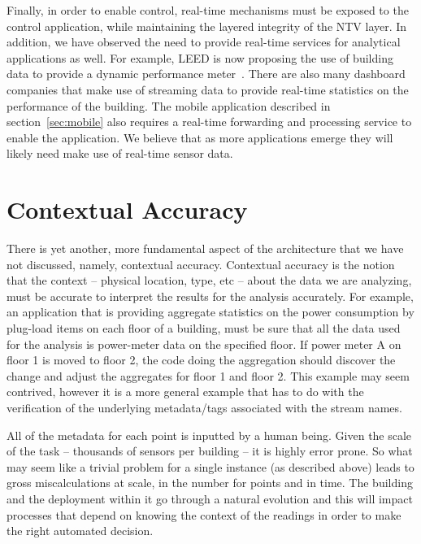 Finally, in order to enable control, real-time mechanisms must be exposed to the control application, while maintaining the 
layered integrity of the NTV layer.  In addition, we have observed the need to provide real-time services for analytical applications
as well.  For example, LEED is now proposing the use of building data to provide a dynamic performance meter~\cite{DynamicLeed}.
There are also many dashboard companies that make use of streaming data to provide real-time statistics on the performance of the
building.  The mobile application described in section~\ref{sec:mobile} also requires a real-time forwarding and processing service to
enable the application.  We believe that as more applications emerge they will likely need make use of real-time sensor data.

\section{Contextual Accuracy}
There is yet another, more fundamental aspect of the architecture that we have not discussed, namely, contextual accuracy.
Contextual accuracy is the notion that the context -- physical location, type, etc -- about the data we are analyzing, must be accurate
to interpret the results for the analysis accurately.  For example, an application that is providing aggregate statistics on the 
power consumption by plug-load items on each floor of a building, must be sure that all the data used for the analysis 
is power-meter data on the specified floor.  If power meter A on floor 1 is moved to floor 2, the code doing the aggregation
should discover the change and adjust the aggregates for floor 1 and floor 2.  This example may seem contrived, however it is a
more general example that has to do with the verification of the underlying metadata/tags associated with the stream names.

All of the metadata for each point is inputted by a human being.  Given the scale of the task -- thousands of sensors per building --
it is highly error prone.  So what may seem like a trivial problem for a single instance (as described above) leads to gross
miscalculations at scale, in the number for points and in time.  The building and the deployment within it go through a natural
evolution and this will impact processes that depend on knowing the context of the readings in order to make the right automated decision.

